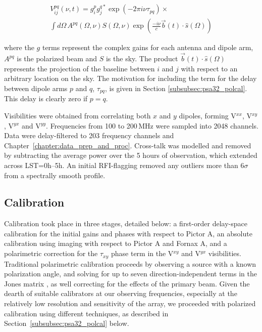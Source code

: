 \begin{equation}
\begin{aligned}
V_{ij}^{pq}(\nu,t) = g^p_i g^{q*}_j \exp(-2\pi i \nu \tau_{pq}) \times \\ \int d\Omega \, A^{pq}(\Omega, \nu)
S(\Omega, \nu) \exp\left(\frac{ -i\nu}{c} \vec{b}(t) \cdot \hat{s}(\Omega)\right)
\end{aligned}
\label{eq:psa32_visibility}
\end{equation}

where the $g$ terms represent the complex gains for each antenna and dipole arm, $A^{pq}$ is the polarized beam and $S$ is the sky. The product $\vec{b}(t) \cdot \hat{s}(\Omega)$ represents the projection of the baseline between $i$ and $j$ with respect to an arbitrary location on the sky. 
The motivation for including the term for the delay between dipole arms $p$ and $q$, $\tau_{pq}$, is given in Section \ref{subsubsec:psa32_polcal}. This delay is clearly zero if $p=q$.

Visibilities were obtained from correlating both $x$ and $y$ dipoles, forming V$^{xx}$, V$^{xy}$, V$^{yx}$ and V$^{yy}$. Frequencies from 100 to 200\,MHz were sampled into 2048 channels.
Data were delay-filtered to 203 frequency channels \citep[see the Appendix of][]{Parsons.14} and Chapter~\ref{chapter:data_prep_and_proc}.  Cross-talk was modelled and removed by subtracting the average power over the 5 hours of observation, which extended across LST=0h--5h. An initial RFI-flagging removed any outliers more than $6\sigma$ from a spectrally smooth profile.

\subsection{Calibration}

Calibration took place in three stages, detailed below: a first-order delay-space calibration for the initial gains and phases with respect to Pictor A, an absolute calibration using imaging with respect to Pictor A and Fornax A, and a polarimetric correction for the $\tau_{xy}$ phase term in the V$^{xy}$ and V$^{yx}$ visibilities. 
Traditional polarimetric calibration proceeds by observing a source with a known polarization angle, and solving for up to seven direction-independent terms in the Jones matrix \citep[e.g.][]{TMS, HBS.1.96}, as well correcting for the effects of the primary beam. 
Given the dearth of suitable calibrators at our observing frequencies, especially at the relatively low resolution and sensitivity of the array, we proceeded with polarized calibration using different techniques, as described in Section~\ref{subsubsec:psa32_polcal} below.

